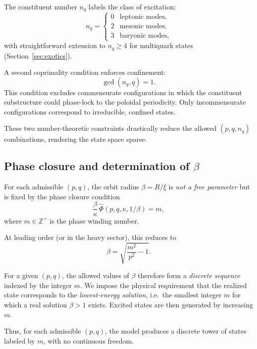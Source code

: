\documentclass[11pt,a4paper]{article}
\begin{document}
The constituent number $n_q$ labels the class of excitation:
\begin{equation}
  n_q =
  \begin{cases}
    0 & \text{leptonic modes},\\
    2 & \text{mesonic modes},\\
    3 & \text{baryonic modes},
  \end{cases}
\end{equation}
with straightforward extension to $n_q \ge 4$ for multiquark
states (Section~\ref{sec:exotics}).

A second coprimality condition enforces confinement:
\begin{equation}
  \gcd(n_q, q) = 1.
  \label{eq:selection_confinement}
\end{equation}
This condition excludes commensurate configurations in which the
constituent substructure could phase-lock to the poloidal
periodicity.  Only incommensurate configurations correspond to
irreducible, confined states.

These two number-theoretic constraints drastically reduce the
allowed $(p,q,n_q)$ combinations, rendering the state space sparse.

\subsection{Phase closure and determination of $\beta$}

For each admissible $(p,q)$, the orbit radius $\beta = R/\xi$ is
\emph{not a free parameter} but is fixed by the phase closure
condition
\begin{equation}
  \frac{\beta}{\kappa}\,\hat{\Phi}(p,q,\kappa,1/\beta) = m,
\end{equation}
where $m \in \mathbb{Z}^+$ is the phase winding number.

At leading order (or in the heavy sector), this reduces to
\begin{equation}
  \beta = \sqrt{\frac{m^2}{p^2} - 1}.
\end{equation}

For a given $(p,q)$, the allowed values of $\beta$ therefore form a
\emph{discrete sequence} indexed by the integer $m$.  We impose the
physical requirement that the realized state corresponds to the
\emph{lowest-energy solution}, i.e.\ the smallest integer $m$ for
which a real solution $\beta > 1$ exists.  Excited states are then
generated by increasing $m$.

Thus, for each admissible $(p,q)$, the model produces a discrete
tower of states labeled by $m$, with no continuous freedom.
\end{document}
